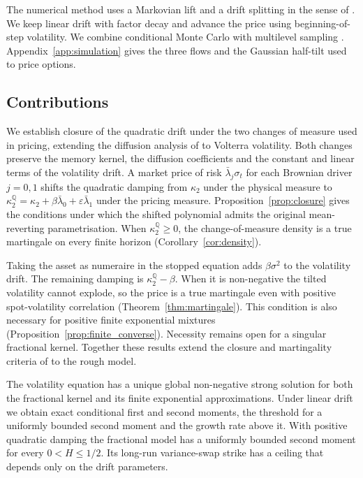 \documentclass{rQUF2e}
\theoremstyle{plain}
\theoremstyle{definition}
\theoremstyle{remark}
\newcommand{\Q}{\mathbb{Q}}
\begin{document}
The numerical method uses a Markovian lift \citep{AbiJaberElEuch2019,AlfonsiKebaier2024} and a drift splitting in the sense of \citet{Shinozaki2026}. We keep linear drift with factor decay and advance the price using beginning-of-step volatility. We combine conditional Monte Carlo \citep{Willard1997,RomanoTouzi1997,McCrickerdPakkanen2018} with multilevel sampling \citep{Giles2008}. Appendix~\ref{app:simulation} gives the three flows and the Gaussian half-tilt used to price options.
\subsection{Contributions}\label{sec:contributions}
We establish closure of the quadratic drift under the two changes of measure used in pricing, extending the diffusion analysis of \citet{SeppRakhmonov2023} to Volterra volatility. Both changes preserve the memory kernel, the diffusion coefficients and the constant and linear terms of the volatility drift. A market price of risk $\bar\lambda_j\sigma_t$ for each Brownian driver $j=0,1$ shifts the quadratic damping from $\kappa_2$ under the physical measure to $\kappa_2^{\Q}=\kappa_2+\beta\bar\lambda_0+\varepsilon\bar\lambda_1$ under the pricing measure. Proposition~\ref{prop:closure} gives the conditions under which the shifted polynomial admits the original mean-reverting parametrisation. When $\kappa_2^{\Q}\ge0$, the change-of-measure density is a true martingale on every finite horizon (Corollary~\ref{cor:density}).

Taking the asset as numeraire in the stopped equation adds $\beta\sigma^2$ to the volatility drift. The remaining damping is $\kappa_2^{\Q}-\beta$. When it is non-negative the tilted volatility cannot explode, so the price is a true martingale even with positive spot-volatility correlation (Theorem~\ref{thm:martingale}). This condition is also necessary for positive finite exponential mixtures (Proposition~\ref{prop:finite_converse}). Necessity remains open for a singular fractional kernel. Together these results extend the closure and martingality criteria of \citet{SeppRakhmonov2026} to the rough model.

The volatility equation has a unique global non-negative strong solution for both the fractional kernel and its finite exponential approximations. Under linear drift we obtain exact conditional first and second moments, the threshold for a uniformly bounded second moment and the growth rate above it. With positive quadratic damping the fractional model has a uniformly bounded second moment for every $0<H\le1/2$. Its long-run variance-swap strike has a ceiling that depends only on the drift parameters.
\end{document}
